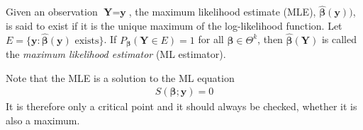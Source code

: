 \begin{definition} 
\label{def:MLE}
Given an observation $\textbf{Y}=\textbf{y}$, the maximum likelihood estimate (MLE), $\hat{\boldsymbol{\beta}}(\textbf{y}))$, is said to exist if it is the unique maximum of the log-likelihood function. 
Let $E = \{ \textbf{y} : \hat{\boldsymbol{\beta}}(\textbf{y}) \text{ exists} \}$. If $P_{\boldsymbol{\beta}}(\textbf{Y} \in E) = 1$ for all $\boldsymbol{\beta} \in \Theta^k$, then $\hat{\boldsymbol{\beta}}(\textbf{Y})$ is called the \textit{maximum likelihood estimator} (ML estimator).
\end{definition}
Note that the MLE is a solution to the ML equation
\begin{align*}
    S(\boldsymbol{\beta}; \textbf{y}) = 0
\end{align*}
It is therefore only a critical point and it should always be checked, whether it is also a maximum. 

